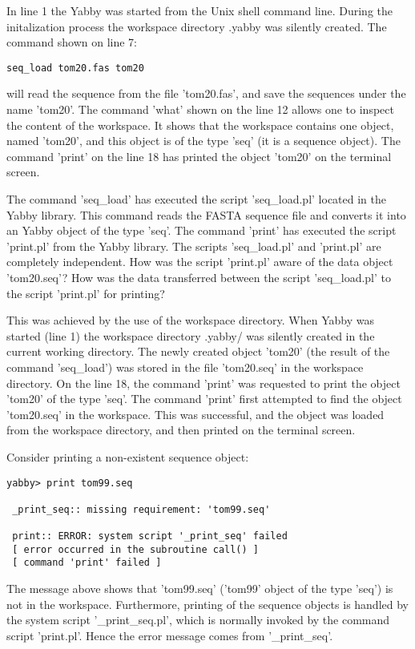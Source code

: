 In line 1 the Yabby was started from the Unix shell command line.
During the initalization process the workspace directory .yabby
was silently created. The command shown on line 7:

\begin{verbatim}
seq_load tom20.fas tom20
\end{verbatim}

will read the sequence from the file 'tom20.fas', and save the sequences
under the name 'tom20'. The command 'what' shown on the line 12 allows
one to inspect the content of the workspace. It shows that the workspace
contains one object, named 'tom20', and this object is of the type 'seq'
(it is a sequence object).  The command 'print' on the line 18 has
printed the object 'tom20' on the terminal screen.

The command 'seq\_load' has executed the script 'seq\_load.pl'
located in the Yabby library. This command reads the FASTA sequence
file and converts it into an Yabby object of the type 'seq'. The
command 'print' has executed the script 'print.pl' from the Yabby
library. The scripts 'seq\_load.pl' and 'print.pl' are completely
independent. How was the script 'print.pl' aware of the data object
'tom20.seq'?  How was the data transferred between the script
'seq\_load.pl' to the script 'print.pl' for printing?

This was achieved by the use of the workspace directory. When Yabby
was started (line 1) the workspace directory .yabby/ was silently
created in the current working directory. The newly created object
'tom20' (the result of the command 'seq\_load') was stored in the
file 'tom20.seq' in the workspace directory. On the line 18, the
command 'print' was requested to print the object 'tom20' of the
type 'seq'. The command 'print' first attempted to find the object
'tom20.seq' in the workspace. This was successful, and the object
was loaded from the workspace directory, and then printed on the
terminal screen.

Consider printing a non-existent sequence object:

\begin{verbatim}
yabby> print tom99.seq

 _print_seq:: missing requirement: 'tom99.seq'

 print:: ERROR: system script '_print_seq' failed
 [ error occurred in the subroutine call() ]
 [ command 'print' failed ]
\end{verbatim}

The message above shows that 'tom99.seq' ('tom99' object of the 
type 'seq') is not in the workspace. Furthermore, printing of the
sequence objects is handled by the system script '\_print\_seq.pl',
which is normally invoked by the command script 'print.pl'. Hence
the error message comes from '\_print\_seq'.

